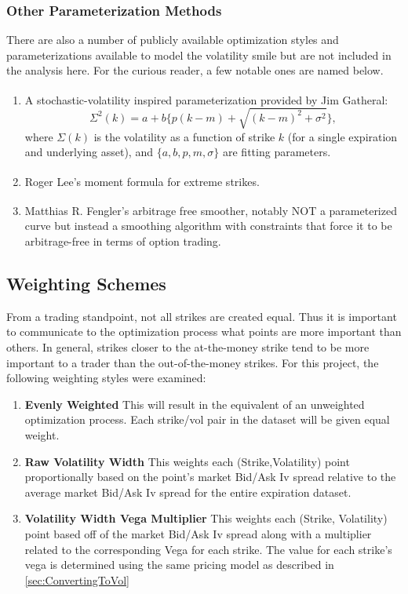 \documentclass[12pt, a4paper, notitlepage]{article}
\numberwithin{equation}{subsection}
\numberwithin{figure}{subsection}
\numberwithin{table}{subsection}
\begin{document}
\subsubsection{Other Parameterization Methods}
There are also a number of publicly available optimization styles and parameterizations available to model the volatility smile but are not included in the analysis here.  For the curious reader, a few notable ones are named below.
\begin{enumerate}
	\item A stochastic-volatility inspired parameterization provided by Jim Gatheral\textsuperscript{\cite{Gatheral}}:
\begin{equation}
\Sigma^{2}(k) = a + b\Big\{p(k-m) + \sqrt{(k-m)^{2}+ \sigma^{2}} \Big\},
\end{equation}
where $\Sigma(k)$ is the volatility as a function of strike $k$ (for a single expiration and underlying asset), and $\{a,b,p,m,\sigma\}$ are fitting parameters.
	\item Roger Lee's moment formula for extreme strikes\textsuperscript{\cite{Lee}}.
    \item Matthias R. Fengler's arbitrage free smoother\textsuperscript{\cite{Fengler}}, notably NOT a parameterized curve but instead a smoothing algorithm with constraints that force it to be arbitrage-free in terms of option trading.
\end{enumerate}

\subsection{Weighting Schemes}\label{sec:WeightingSchemes}
From a trading standpoint, not all strikes are created equal.  Thus it is important to communicate to the optimization process what points are more important than others.  In general, strikes closer to the at-the-money strike tend to be more important to a trader than the out-of-the-money strikes.  For this project, the following weighting styles were examined:

\begin{enumerate}
	\item \textbf{Evenly Weighted} \newline This will result in the equivalent of an unweighted optimization process.  Each strike/vol pair in the dataset will be given equal weight.
    \item \textbf{Raw Volatility Width} \newline This weights each (Strike,Volatility) point proportionally based on the point's market Bid/Ask Iv spread relative to the average market Bid/Ask Iv spread for the entire expiration dataset.
    \item \textbf{Volatility Width Vega Multiplier} \newline This weights each (Strike, Volatility) point based off of the market Bid/Ask Iv spread along with a multiplier related to the corresponding Vega for each strike.  The value for each strike's vega is determined using the same pricing model as described in \ref{sec:ConvertingToVol}
\end{enumerate}
\end{document}
